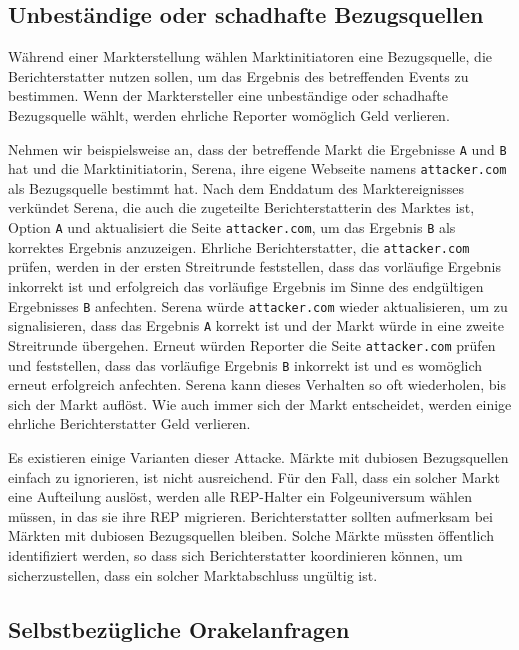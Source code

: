 \documentclass[floatfix,reprint,nofootinbib,amsmath,amssymb,epsfig,pre,floats,letterpaper,groupedaffiliation]{revtex4-1}
\theoremstyle{definition}
\theoremstyle{definition}
\theoremstyle{definition}
\begin{document}
\subsection{Unbeständige oder schadhafte Bezugsquellen}

Während einer Markterstellung wählen Marktinitiatoren eine Bezugsquelle, die Berichterstatter nutzen sollen, um das Ergebnis des betreffenden Events zu bestimmen. Wenn der Marktersteller eine unbeständige oder schadhafte Bezugsquelle wählt, werden ehrliche Reporter womöglich Geld verlieren.

Nehmen wir beispielsweise an, dass der betreffende Markt die Ergebnisse \texttt{A} und \texttt{B} hat und die Marktinitiatorin, Serena, ihre eigene Webseite namens \texttt{attacker.com} als Bezugsquelle bestimmt hat. Nach dem Enddatum des Marktereignisses verkündet Serena, die auch die zugeteilte Berichterstatterin des Marktes ist, Option \texttt{A} und aktualisiert die Seite \texttt{attacker.com}, um das Ergebnis \texttt{B} als korrektes Ergebnis anzuzeigen. Ehrliche Berichterstatter, die \texttt{attacker.com} prüfen, werden in der ersten Streitrunde feststellen, dass das vorläufige Ergebnis inkorrekt ist und erfolgreich das vorläufige Ergebnis im Sinne des endgültigen Ergebnisses \texttt{B} anfechten. Serena würde \texttt{attacker.com} wieder aktualisieren, um zu signalisieren, dass das Ergebnis \texttt{A} korrekt ist und der Markt würde in eine zweite Streitrunde übergehen. Erneut würden Reporter die Seite \texttt{attacker.com} prüfen und feststellen, dass das vorläufige Ergebnis \texttt{B} inkorrekt ist und es womöglich erneut erfolgreich anfechten. Serena kann dieses Verhalten so oft wiederholen, bis sich der Markt auflöst. Wie auch immer sich der Markt entscheidet, werden einige ehrliche Berichterstatter Geld verlieren.

Es existieren einige Varianten dieser Attacke. Märkte mit dubiosen Bezugsquellen einfach zu ignorieren, ist nicht ausreichend. Für den Fall, dass ein solcher Markt eine Aufteilung auslöst, werden alle REP-Halter ein Folgeuniversum wählen müssen, in das sie ihre REP migrieren. Berichterstatter sollten aufmerksam bei Märkten mit dubiosen Bezugsquellen bleiben. Solche Märkte müssten öffentlich identifiziert werden, so dass sich Berichterstatter koordinieren können, um sicherzustellen, dass ein solcher Marktabschluss ungültig ist.

\subsection{Selbstbezügliche Orakelanfragen}
\end{document}
